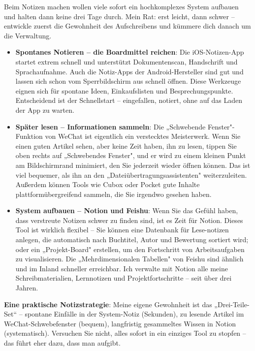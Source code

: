 
Beim Notizen machen wollen viele sofort ein hochkomplexes System aufbauen und halten dann keine drei Tage durch. Mein Rat: erst leicht, dann schwer – entwickle zuerst die Gewohnheit des Aufschreibens und kümmere dich danach um die Verwaltung.

\begin{itemize}
  \item \textbf{Spontanes Notieren – die Boardmittel reichen}: Die iOS-Notizen-App startet extrem schnell und unterstützt Dokumentenscan, Handschrift und Sprachaufnahme. Auch die Notiz-Apps der Android-Hersteller sind gut und lassen sich schon vom Sperrbildschirm aus schnell öffnen. Diese Werkzeuge eignen sich für spontane Ideen, Einkaufslisten und Besprechungspunkte. Entscheidend ist der Schnellstart – eingefallen, notiert, ohne auf das Laden der App zu warten.
  \item \textbf{Später lesen – Informationen sammeln}: Die „Schwebende Fenster"-Funktion von WeChat ist eigentlich ein verstecktes Meisterwerk. Wenn Sie einen guten Artikel sehen, aber keine Zeit haben, ihn zu lesen, tippen Sie oben rechts auf „Schwebendes Fenster", und er wird zu einem kleinen Punkt am Bildschirmrand minimiert, den Sie jederzeit wieder öffnen können. Das ist viel bequemer, als ihn an den „Dateiübertragungsassistenten" weiterzuleiten. Außerdem können Tools wie Cubox oder Pocket gute Inhalte plattformübergreifend sammeln, die Sie irgendwo gesehen haben.
  \item \textbf{System aufbauen – Notion und Feishu}: Wenn Sie das Gefühl haben, dass verstreute Notizen schwer zu finden sind, ist es Zeit für Notion. Dieses Tool ist wirklich flexibel – Sie können eine Datenbank für Lese-notizen anlegen, die automatisch nach Buchtitel, Autor und Bewertung sortiert wird; oder ein „Projekt-Board" erstellen, um den Fortschritt von Arbeitsaufgaben zu visualisieren. Die „Mehrdimensionalen Tabellen" von Feishu sind ähnlich und im Inland schneller erreichbar. Ich verwalte mit Notion alle meine Schreibmaterialien, Lernnotizen und Projektfortschritte – seit über drei Jahren.
\end{itemize}

\textbf{Eine praktische Notizstrategie}: Meine eigene Gewohnheit ist das „Drei-Teile-Set“ – spontane Einfälle in der System-Notiz (Sekunden), zu lesende Artikel im WeChat-Schwebefenster (bequem), langfristig gesammeltes Wissen in Notion (systematisch). Versuchen Sie nicht, alles sofort in ein einziges Tool zu stopfen – das führt eher dazu, dass man aufgibt.

